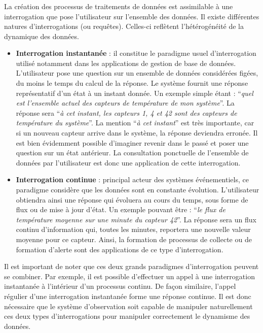 \subsubsection{\critereBA}
La création des processus de traitements de données est assimilable à une interrogation que pose l'utilisateur sur l'ensemble des données. Il existe différentes natures d'interrogations (ou requêtes). Celles-ci reflètent l'hétérogénéité de la dynamique des données.
\begin{itemize}
    \item \textbf{Interrogation instantanée} : il constitue le paradigme usuel d'interrogation utilisé notamment dans les applications de gestion de base de données. L'utilisateur pose une question sur un ensemble de données considérées figées, du moins le temps du calcul de la réponse. Le système fournit une réponse représentatif d'un état à un instant donnée. Un exemple simple étant : \enquote{\it quel est l'ensemble actuel des capteurs de température de mon système}. La réponse sera \enquote{\it à cet instant, les capteurs 1, 4 et 42 sont des capteurs de température du système}. La mention \enquote{\it à cet instant} est très importante, car si un nouveau capteur arrive dans le système, la réponse deviendra erronée. Il est bien évidemment possible d'imaginer revenir dans le passé et poser une question sur un état antérieur. La consultation ponctuelle de l'ensemble de données par l'utilisateur est donc une application de cette interrogation.
    \item \textbf{Interrogation continue} : principal acteur des systèmes événementiels, ce paradigme considère que les données sont en constante évolution. L'utilisateur obtiendra ainsi une réponse qui évoluera au cours du temps, sous forme de flux ou de mise à jour d'état. Un exemple pouvant être : \enquote{\it le flux de température moyenne sur une minute du capteur 42}. La réponse sera un flux continu d'information qui, toutes les minutes, reportera une nouvelle valeur moyenne pour ce capteur. Ainsi, la formation de processus de collecte ou de formation d'alerte sont des applications de ce type d'interrogation.
\end{itemize}
Il est important de noter que ces deux grands paradigmes d'interrogation peuvent se combiner. Par exemple, il est possible d'effectuer un appel à une interrogation instantanée à l'intérieur d'un processus continu. De façon similaire, l'appel régulier d'une interrogation instantanée forme une réponse continue. Il est donc nécessaire que le système d'observation soit capable de manipuler naturellement ces deux types d'interrogations pour manipuler correctement le dynamisme des données.

